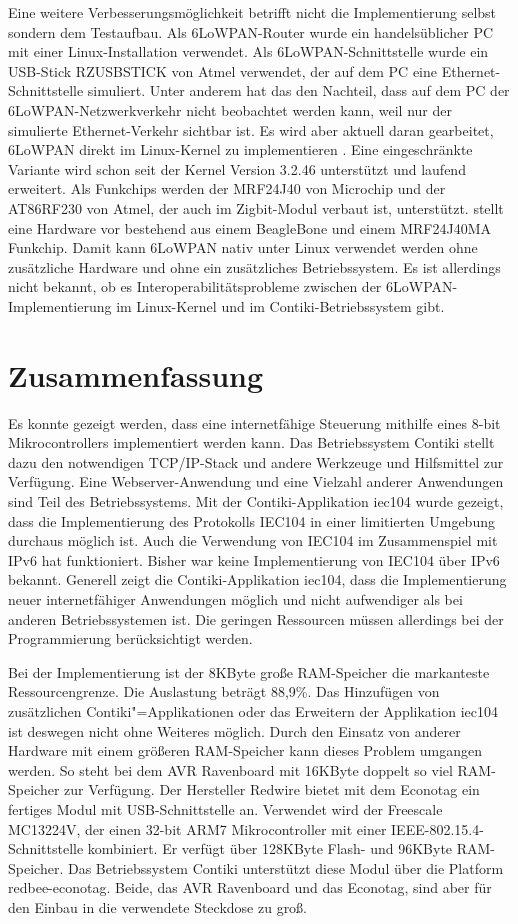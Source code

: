 Eine weitere Verbesserungsmöglichkeit betrifft nicht die Implementierung selbst sondern dem Testaufbau. Als 6LoWPAN-Router wurde ein handelsüblicher PC mit einer Linux-Installation verwendet. Als 6LoWPAN-Schnittstelle wurde ein USB-Stick RZUSBSTICK von Atmel verwendet, der auf dem PC eine Ethernet-Schnittstelle simuliert. Unter anderem hat das den Nachteil, dass auf dem PC der 6LoWPAN-Netzwerkverkehr nicht beobachtet werden kann, weil nur der simulierte Ethernet-Verkehr sichtbar ist. Es wird aber aktuell daran gearbeitet, 6LoWPAN direkt im Linux-Kernel zu implementieren \citep{Ott2012}. Eine eingeschränkte Variante wird schon seit der Kernel Version 3.2.46 unterstützt und laufend erweitert. Als Funkchips werden der MRF24J40 von Microchip und der AT86RF230 von Atmel, der auch im Zigbit-Modul verbaut ist, unterstützt. \citeauthor{Ott2012} stellt eine Hardware vor bestehend aus einem BeagleBone und einem MRF24J40MA Funkchip. Damit kann 6LoWPAN nativ unter Linux verwendet werden ohne zusätzliche Hardware und ohne ein zusätzliches Betriebssystem. Es ist allerdings nicht bekannt, ob es Interoperabilitätsprobleme zwischen der 6LoWPAN-Implementierung im Linux-Kernel und im Contiki-Betriebssystem gibt.

\section{Zusammenfassung}

Es konnte gezeigt werden, dass eine internetfähige Steuerung mithilfe eines 8-bit Mikrocontrollers implementiert werden kann. Das Betriebssystem Contiki stellt dazu den notwendigen TCP/IP-Stack und andere Werkzeuge und Hilfsmittel zur Verfügung. Eine Webserver-Anwendung und eine Vielzahl anderer Anwendungen sind Teil des Betriebssystems. Mit der Contiki-Applikation iec104 wurde gezeigt, dass die Implementierung des Protokolls IEC104 in einer limitierten Umgebung durchaus möglich ist. Auch die Verwendung von IEC104 im Zusammenspiel mit IPv6 hat funktioniert. Bisher war keine Implementierung von IEC104 über IPv6 bekannt. Generell zeigt die Contiki-Applikation iec104, dass die Implementierung neuer internetfähiger Anwendungen möglich und nicht aufwendiger als bei anderen Betriebssystemen ist. Die geringen Ressourcen müssen allerdings bei der Programmierung berücksichtigt werden.

Bei der Implementierung ist der 8KByte große RAM-Speicher die markanteste Ressourcengrenze. Die Auslastung beträgt 88,9\%. Das Hinzufügen von zusätzlichen Contiki"=Applikationen oder das Erweitern der Applikation iec104 ist deswegen nicht ohne Weiteres möglich. Durch den Einsatz von anderer Hardware mit einem größeren RAM-Speicher kann dieses Problem umgangen werden. So steht bei dem AVR Ravenboard mit 16KByte doppelt so viel RAM-Speicher zur Verfügung. Der Hersteller Redwire bietet mit dem Econotag ein fertiges Modul mit USB-Schnittstelle an. Verwendet wird der Freescale MC13224V, der einen 32-bit ARM7 Mikrocontroller mit einer IEEE-802.15.4-Schnittstelle kombiniert. Er verfügt über 128KByte Flash- und 96KByte RAM-Speicher. Das Betriebssystem Contiki unterstützt diese Modul über die Platform redbee-econotag. Beide, das AVR Ravenboard und das Econotag, sind aber für den Einbau in die verwendete Steckdose zu groß.

